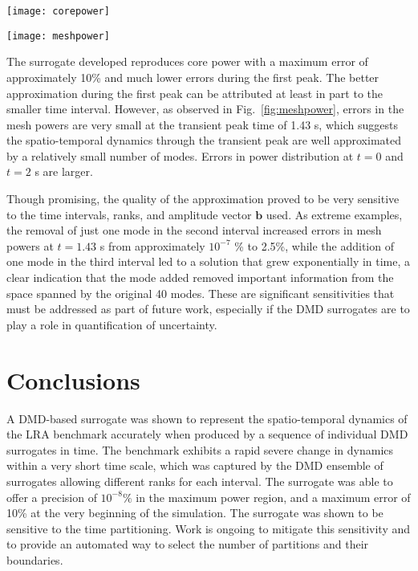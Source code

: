 \documentclass{anstrans}
\begin{document}
\begin{figure*}[t!]
 \centering
 \texttt{[image: corepower]}\\
   \caption{Left and center: reference and approximate core power density; right: corresponding absolute, relative error.}
  \label{fig:corepower}
\end{figure*}

\begin{figure*}[t!]
 \centering
 \texttt{[image: meshpower]}\\
   \caption{Left and center: reference and approximate mesh-wise powers (W); right: corresponding absolute, relative error.}
  \label{fig:meshpower}
\end{figure*}

The surrogate developed reproduces core power with a maximum error of approximately 10\% and much lower errors during the first peak.  The better approximation during the first peak can be attributed at least in part to the smaller time interval.  However, as observed in Fig.~\ref{fig:meshpower}, errors in the mesh powers are very small at the transient peak time of 1.43 s, which suggests the spatio-temporal dynamics through the transient peak are well approximated by a relatively small number of modes.  Errors in power distribution at $t = 0$ and $t = 2$ s are larger.


Though promising, the quality of the approximation proved to be very sensitive to the time intervals, ranks, and amplitude vector $\mathbf{b}$ used.  As extreme examples, the removal of just one mode in the second interval increased errors in mesh powers at $t = 1.43$ s from approximately $10^{-7}$ \% to 2.5\%, while the addition of one mode in the third interval led to a solution that grew exponentially in time, a clear indication that the mode added removed important information from the space spanned by the original 40 modes.  These are  significant sensitivities that must be addressed as part of future work, especially if the DMD surrogates are to play a role in quantification of uncertainty.



\section{Conclusions}

A DMD-based surrogate was shown to represent the spatio-temporal dynamics of the LRA benchmark accurately when produced by a sequence of individual DMD surrogates in time. The benchmark exhibits a rapid severe change in dynamics within a very short time scale, which was captured by the DMD ensemble of surrogates allowing different ranks for each interval. The surrogate was able to offer a precision of $10^{-8}\%$ in the maximum power region, and a maximum error of 10\% at the very beginning of the simulation. The surrogate was shown to be sensitive to the time partitioning.     Work is ongoing to mitigate this sensitivity and to provide an automated way to select the number of partitions and their boundaries.  
\end{document}
